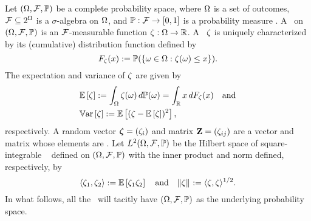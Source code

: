 Let $(\Omega, \mathcal{F}, \mathbb{P})$ be a complete probability space, where $\Omega$ is a set of outcomes, $\mathcal{F} \subseteq 2^\Omega$ is a $\sigma$-algebra on $\Omega$, and $\mathbb{P}: \mathcal{F} \to [0, 1]$ is a probability measure \cite{durrett2010}.
A \rv\ on $(\Omega, \mathcal{F}, \mathbb{P})$ is an $\mathcal{F}$-measurable function $\zeta: \Omega \to \mathbb{R}$.
A \rv\ $\zeta$ is uniquely characterized by its (cumulative) distribution function defined by
\begin{equation*}
  F_\zeta(x) := \mathbb{P}(\{ \omega \in \Omega: \zeta(\omega) \leq x \}).
\end{equation*}
The expectation and variance of $\zeta$ are given by
\begin{align*}
  & \mathbb{E}\left[ \zeta \right] := \int_\Omega \zeta(\omega) \, d\mathbb{P}(\omega) = \int_{\mathbb{R}} x \, d F_\zeta(x) \hspace{1em} \text{and} \\
  & \mathbb{V}\text{ar}\left[ \zeta \right] := \mathbb{E}\left[ (\zeta - \mathbb{E}\left[ \zeta \right])^2 \right],
\end{align*}
respectively.
A random vector $\bm{\zeta} = (\zeta_i)$ and matrix $\mathbf{Z} = (\zeta_{ij})$ are a vector and matrix whose elements are \rvs.
Let $L^{2}(\Omega, \mathcal{F}, \mathbb{P})$ be the Hilbert space of square-integrable \rvs\ \cite{janson1997} defined on $(\Omega, \mathcal{F}, \mathbb{P})$ with the inner product and norm defined, respectively, by
\begin{equation*}
  \langle \zeta_1, \zeta_2 \rangle := \mathbb{E}\left[ \zeta_1 \zeta_2 \right] \hspace{1em} \text{and} \hspace{1em} \| \zeta \|_{} := \langle \zeta, \zeta \rangle^{1/2}.
\end{equation*}
In what follows, all the \rvs\ will tacitly have $(\Omega, \mathcal{F}, \mathbb{P})$ as the underlying probability space.

